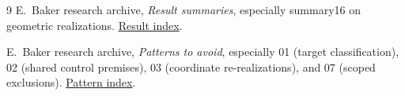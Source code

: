 \documentclass[11pt]{article}
\theoremstyle{remark}
\numberwithin{equation}{section}
\begin{document}
\begin{thebibliography}{9}
E.~Baker research archive, \emph{Result summaries}, especially
summary16 on geometric realizations.
\href{https://github.com/ebbaker/shifted-zeta-positivity/tree/main/result-summaries}
{Result index}.

E.~Baker research archive, \emph{Patterns to avoid}, especially
01 (target classification), 02 (shared control premises),
03 (coordinate re-realizations), and 07 (scoped exclusions).
\href{https://github.com/ebbaker/shifted-zeta-positivity/tree/main/avoid}
{Pattern index}.
\end{thebibliography}
\end{document}

